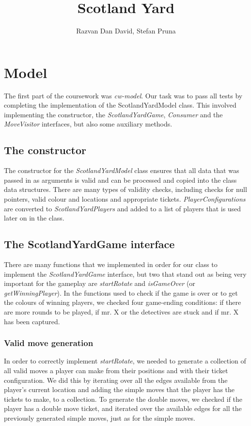 \documentclass[12pt,a4paper]{scrartcl}
\begin{document}
\title{Scotland Yard}
\author{Razvan Dan David, Stefan Pruna}
\maketitle

\section{Model}
The first part of the coursework was \textit{cw-model}. Our task was to pass all tests by completing the implementation of the ScotlandYardModel class. This involved implementing the constructor, the \textit{ScotlandYardGame}, \textit{Consumer} and the \textit{MoveVisitor} interfaces, but also some auxiliary methods.

\subsection*{The constructor}
The constructor for the \textit{ScotlandYardModel} class ensures that all data that was passed in as arguments is valid and can be processed and copied into the class data structures. There are many types of validity checks, including checks for null pointers, valid colour and locations and appropriate tickets. \textit{PlayerConfigurations} are converted to \textit{ScotlandYardPlayers} and added to a list of players that is used later on in the class.

\subsection*{The ScotlandYardGame interface}
There are many functions that we implemented in order for our class to implement the \textit{ScotlandYardGame} interface, but two that stand out as being very important for the gameplay are \textit{startRotate} and \textit{isGameOver} (or \textit{getWinningPlayer}). In the functions used to check if the game is over or to get the colours of winning players, we checked four game-ending conditions: if there are more rounds to be played, if mr. X or the detectives are stuck and if mr. X has been captured.

\subsubsection*{Valid move generation} 
In order to correctly implement \textit{startRotate}, we needed to generate a collection of all valid moves a player can make from their positions and with their ticket configuration. We did this by iterating over all the edges available from the player's current location and adding the simple moves that the player has the tickets to make, to a collection. To generate the double moves, we checked if the player has a double move ticket, and iterated over the available edges for all the previously generated simple moves, just as for the simple moves.
\end{document}
